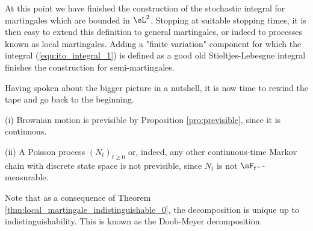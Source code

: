 At this point we have finished the construction of the stochastic integral for martingales which are bounded in $\sL^2$. Stopping at suitable stopping times, it is then easy to extend this definition to general martingales, or indeed to processes known as local martingales. Adding a "finite variation" component for which the integral (\ref{equ:ito_integral_1}) is defined as a good old Stieltjes-Lebesgue integral finishes the construction for semi-martingales.

Having spoken about the bigger picture in a nutshell, it is now time to rewind the tape
and go back to the beginning.



\begin{example}
\ben
\item [(i)] Brownian motion is previsible by Proposition \ref{pro:previsible}, since it is continuous.
\item [(ii)] A Poisson process $(N_t)_{t\geq 0}$ or, indeed, any other continuous-time Markov chain with discrete state space is not previsible, since $N_t$ is not $\sF_{t^-}$-measurable.
\een
\end{example}




Note that as a consequence of Theorem \ref{thm:local_martingale_indistinguishable_0}, the decomposition is unique up to indistinguishability. This is known as the Doob-Meyer decomposition.


